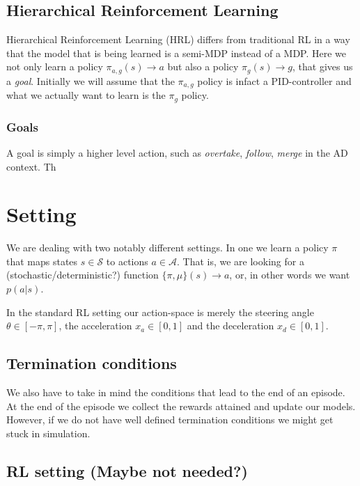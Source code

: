 \documentclass{article}
\begin{document}
\subsection{Hierarchical Reinforcement Learning}

Hierarchical Reinforcement Learning (HRL) differs from traditional RL in a way that the model that is being learned is a semi-MDP instead of a MDP. Here we not only learn a policy $\pi_{a,g}(s) \rightarrow a$ but also a policy $\pi_g(s) \rightarrow g$, that gives us a \textit{goal}. Initially we will assume that the $\pi_{a,g}$ policy is infact a PID-controller and what we actually want to learn is the $\pi_{g}$ policy.

\subsubsection{Goals}

A goal is simply a higher level action, such as \textit{overtake}, \textit{follow}, \textit{merge} in the AD context. Th



\section{Setting}
We are dealing with two notably different settings. In one we learn a policy $\pi$ that maps states $s \in \mathcal{S}$ to actions $a \in \mathcal{A}$. That is, we are looking for a (stochastic/deterministic?) function $\{\pi,\mu\}(s) \rightarrow a$, or, in other words we want $p(a|s)$.

In the standard RL setting our action-space is merely the steering angle $\theta \in [-\pi,\pi]$, the acceleration $x_a \in [0,1]$ and the deceleration $x_d \in [0,1]$.

\subsection{Termination conditions}

We also have to take in mind the conditions that lead to the end of an episode. At the end of the episode we collect the rewards attained and update our models. However, if we do not have well defined termination conditions we might get stuck in simulation.

\subsection{RL setting (Maybe not needed?)}
\end{document}
